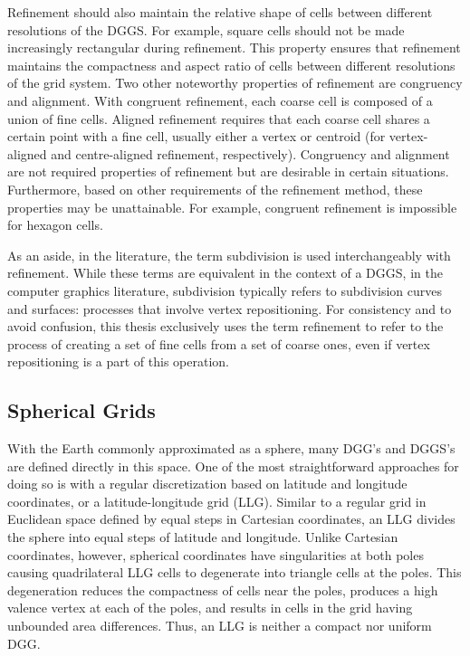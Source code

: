 Refinement should also maintain the relative shape of cells between different resolutions of the DGGS.
For example, square cells should not be made increasingly rectangular during refinement.
This property ensures that refinement maintains the compactness and aspect ratio of cells between different resolutions of the grid system.
Two other noteworthy properties of refinement are congruency and alignment.
With congruent refinement, each coarse cell is composed of a union of fine cells.
Aligned refinement requires that each coarse cell shares a certain point with a fine cell, usually either a vertex or centroid (for vertex-aligned and centre-aligned refinement, respectively).
Congruency and alignment are not required properties of refinement but are desirable in certain situations.
Furthermore, based on other requirements of the refinement method, these properties may be unattainable. For example, congruent refinement is impossible for hexagon cells.


As an aside, in the literature, the term subdivision is used interchangeably with refinement.
While these terms are equivalent in the context of a DGGS, in the computer graphics literature, subdivision typically refers to subdivision curves and surfaces: processes that involve vertex repositioning.
For consistency and to avoid confusion, this thesis exclusively uses the term refinement to refer to the process of creating a set of fine cells from a set of coarse ones, even if vertex repositioning is a part of this operation.


\subsection{Spherical Grids}
With the Earth commonly approximated as a sphere, many DGG's and DGGS's are defined directly in this space.
One of the most straightforward approaches for doing so is with a regular discretization based on latitude and longitude coordinates, or a latitude-longitude grid (LLG).
Similar to a regular grid in Euclidean space defined by equal steps in Cartesian coordinates, an LLG divides the sphere into equal steps of latitude and longitude.
Unlike Cartesian coordinates, however, spherical coordinates have singularities at both poles causing quadrilateral LLG cells to degenerate into triangle cells at the poles.
This degeneration reduces the compactness of cells near the poles, produces a high valence vertex at each of the poles, and results in cells in the grid having unbounded area differences.
Thus, an LLG is neither a compact nor uniform DGG.


